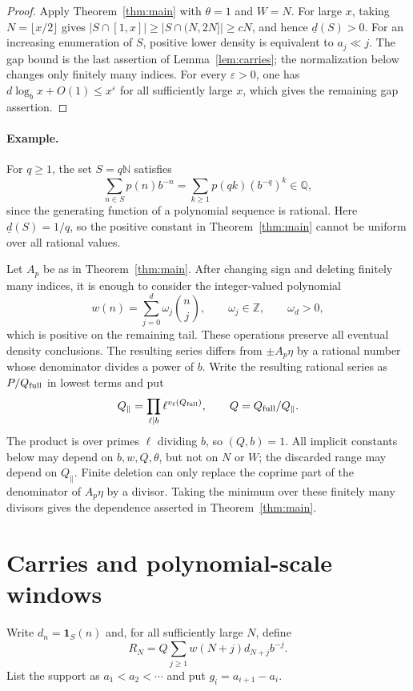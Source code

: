 \documentclass[a4paper,10pt]{amsart}
\theoremstyle{remark}
\newcommand{\N}{\mathbb N}
\newcommand{\Q}{\mathbb Q}
\newcommand{\Z}{\mathbb Z}
\begin{document}
\begin{proof}
Apply Theorem~\ref{thm:main} with $\theta=1$ and $W=N$. For large $x$, taking
$N=\lfloor x/2\rfloor$ gives
$|S\cap[1,x]|\ge|S\cap(N,2N]|\ge cN$, and hence
$\underline d(S)>0$. For an increasing enumeration of $S$, positive lower
density is equivalent to $a_j\ll j$. The gap bound is the last assertion of
Lemma~\ref{lem:carries}; the normalization below changes only finitely many
indices. For every $\varepsilon>0$, one has
$d\log_b x+O(1)\le x^\varepsilon$ for all sufficiently large $x$, which gives
the remaining gap assertion.
\end{proof}

\paragraph{Example.}
For $q\ge1$, the set $S=q\N$ satisfies
\[
 \sum_{n\in S}p(n)b^{-n}
 =\sum_{k\ge1}p(qk)(b^{-q})^k\in\Q,
\]
since the generating function of a polynomial sequence is rational. Here
$\underline d(S)=1/q$, so the positive constant in
Theorem~\ref{thm:main} cannot be uniform over all rational values.

Let $A_p$ be as in Theorem~\ref{thm:main}. After changing sign and deleting
finitely many indices, it is enough to consider the integer-valued polynomial
\[
 w(n)=\sum_{j=0}^d\omega_j\binom nj,\qquad
 \omega_j\in\Z,\qquad \omega_d>0,
\]
which is positive on the remaining tail. These operations preserve all
eventual density conclusions. The resulting series differs from
$\pm A_p\eta$ by a rational number whose denominator divides a power of $b$.
Write the resulting rational series as $P/Q_{\rm full}$ in lowest terms and
put
\[
 Q_{\parallel}=\prod_{\ell\mid b}\ell^{v_\ell(Q_{\rm full})},
 \qquad Q=Q_{\rm full}/Q_{\parallel}.
\]
The product is over primes $\ell$ dividing $b$, so $(Q,b)=1$. All implicit
constants below may depend on $b,w,Q,\theta$, but not on $N$ or $W$; the
discarded range may depend on $Q_{\parallel}$. Finite deletion can only replace
the coprime part of the denominator of $A_p\eta$ by a divisor. Taking the
minimum over these finitely many divisors gives the dependence asserted in
Theorem~\ref{thm:main}.

\section{Carries and polynomial-scale windows}

Write $d_n=\mathbf1_S(n)$ and, for all sufficiently large $N$, define
\[
 R_N=Q\sum_{j\ge1}w(N+j)d_{N+j}b^{-j}.
\]
List the support as $a_1<a_2<\cdots$ and put $g_i=a_{i+1}-a_i$.
\end{document}
